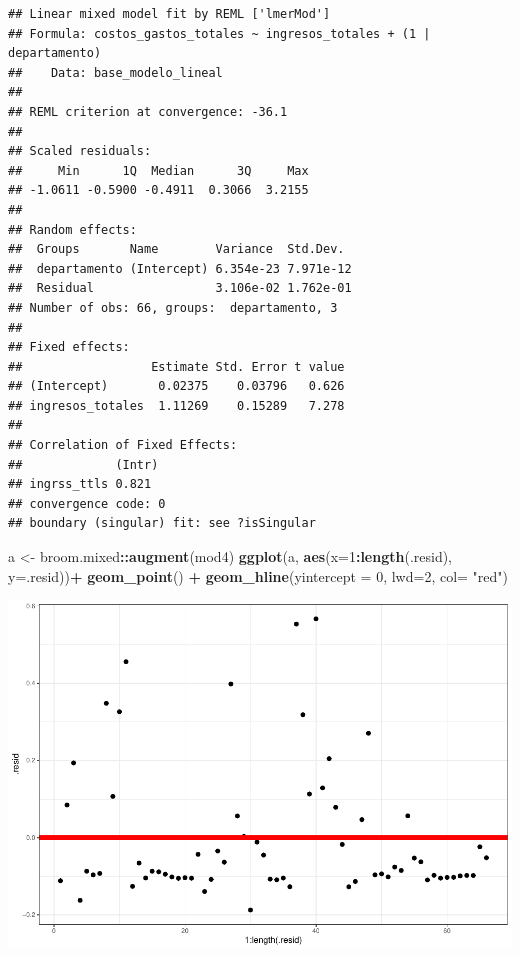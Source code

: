 \documentclass[
  11pt,
  a4paper,
]{book}
\newenvironment{Shaded}{\begin{snugshade}}{\end{snugshade}}
\newcommand{\DataTypeTok}[1]{\textcolor[rgb]{0.13,0.29,0.53}{#1}}
\newcommand{\DecValTok}[1]{\textcolor[rgb]{0.00,0.00,0.81}{#1}}
\newcommand{\KeywordTok}[1]{\textcolor[rgb]{0.13,0.29,0.53}{\textbf{#1}}}
\newcommand{\NormalTok}[1]{#1}
\newcommand{\OperatorTok}[1]{\textcolor[rgb]{0.81,0.36,0.00}{\textbf{#1}}}
\newcommand{\StringTok}[1]{\textcolor[rgb]{0.31,0.60,0.02}{#1}}
\begin{document}
\begin{verbatim}
## Linear mixed model fit by REML ['lmerMod']
## Formula: costos_gastos_totales ~ ingresos_totales + (1 | departamento)
##    Data: base_modelo_lineal
## 
## REML criterion at convergence: -36.1
## 
## Scaled residuals: 
##     Min      1Q  Median      3Q     Max 
## -1.0611 -0.5900 -0.4911  0.3066  3.2155 
## 
## Random effects:
##  Groups       Name        Variance  Std.Dev. 
##  departamento (Intercept) 6.354e-23 7.971e-12
##  Residual                 3.106e-02 1.762e-01
## Number of obs: 66, groups:  departamento, 3
## 
## Fixed effects:
##                  Estimate Std. Error t value
## (Intercept)       0.02375    0.03796   0.626
## ingresos_totales  1.11269    0.15289   7.278
## 
## Correlation of Fixed Effects:
##             (Intr)
## ingrss_ttls 0.821 
## convergence code: 0
## boundary (singular) fit: see ?isSingular
\end{verbatim}

\begin{Shaded}
\begin{Highlighting}[]
\NormalTok{a <-}\StringTok{ }\NormalTok{broom.mixed}\OperatorTok{::}\KeywordTok{augment}\NormalTok{(mod4) }
\KeywordTok{ggplot}\NormalTok{(a, }\KeywordTok{aes}\NormalTok{(}\DataTypeTok{x=}\DecValTok{1}\OperatorTok{:}\KeywordTok{length}\NormalTok{(.resid), }\DataTypeTok{y=}\NormalTok{.resid))}\OperatorTok{+}
\StringTok{  }\KeywordTok{geom_point}\NormalTok{() }\OperatorTok{+}\StringTok{ }
\StringTok{  }\KeywordTok{geom_hline}\NormalTok{(}\DataTypeTok{yintercept =} \DecValTok{0}\NormalTok{, }\DataTypeTok{lwd=}\DecValTok{2}\NormalTok{, }\DataTypeTok{col=} \StringTok{"red"}\NormalTok{)}
\end{Highlighting}
\end{Shaded}

\includegraphics{index_files/figure-latex/unnamed-chunk-23-1.pdf}
\end{document}
